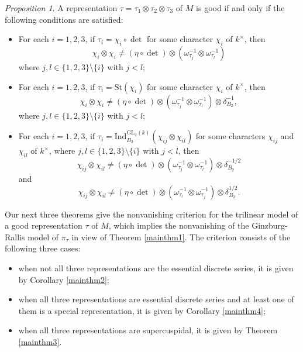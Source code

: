 \documentclass[12pt]{amsart}
\newcommand{\GL}{{\mathrm{GL}}}
\theoremstyle{Theorem}
\theoremstyle{Theorem}
\theoremstyle{Theorem}
\theoremstyle{Theorem}
\theoremstyle{Plain}
\theoremstyle{remark}
\theoremstyle{remark}
\theoremstyle{Definition}
\newtheorem{prpd}[dfn]{Proposition}
\begin{document}
\begin{prpd}
    \label{goodcr}
    A representation $ \tau = \tau_1 \otimes \tau_2 \otimes \tau_3 $ of $M$ is good if and only if the following conditions are satisfied: 
    \begin{itemize}
        \item[(G1)] For each $ i = 1, 2, 3 $, if $ \tau_i = \chi_i \circ \det $ for some character $\chi_i$ of $k^\times$, then
        \[
            \chi_i \otimes \chi_i \ne ( \eta \circ \det ) \otimes \left( \omega_{ \tau_j }^{-1} \otimes \omega_{ \tau_l }^{-1} \right)
        \]
        where $ j, l \in \{ 1, 2, 3 \} \setminus \{ i \} $ with $ j < l $;
        \item[(G2)] For each $ i = 1, 2, 3 $, if $ \tau_i = \mathrm{St} \left( \chi_i \right) $ for some character $\chi_i$ of $k^\times$, then
        \[
            \chi_i \otimes \chi_i \ne ( \eta \circ \det ) \otimes \left( \omega_{ \tau_j }^{-1} \otimes \omega_{ \tau_l }^{-1} \right) \otimes \delta_{B_2}^{-1},
        \]
        where $ j, l \in \{ 1, 2, 3 \} \setminus \{ i \} $ with $ j < l $;
        \item[(G3)] For each $ i = 1, 2, 3 $, if $ \tau_i = \mathrm{Ind}_{B_2}^{ \GL_2(k) } ( \chi_{ij} \otimes \chi_{il} ) $ for some characters $ \chi_{ij} $ and $ \chi_{il} $ of $k^\times$, where $ j, l \in \{ 1, 2, 3 \} \setminus \{ i \} $ with $ j < l $, then
        \[
            \chi_{ij} \otimes \chi_{il} \ne  ( \eta \circ \det ) \otimes \left( \omega_{ \tau_j }^{-1} \otimes \omega_{ \tau_l }^{-1} \right) \otimes \delta_{B_2}^{-1/2}
        \]
        and
        \[
            \chi_{ij} \otimes \chi_{il} \ne ( \eta \circ \det ) \otimes \left( \omega_{ \tau_l }^{-1} \otimes \omega_{ \tau_j }^{-1} \right) \otimes \delta_{B_2}^{1/2}.
        \]
    \end{itemize}
\end{prpd}

Our next three theorems give the nonvanishing criterion for the trilinear model of a good representation $\tau$ of $M$, which implies the nonvanishing of the Ginzburg-Rallis model 
of $ \pi_\tau $ in view of Theorem \ref{mainthm1}. The criterion consists of the following three cases:
\begin{itemize}
    \item when not all three representations are the essential discrete series, it is given by Corollary \ref{mainthm2};
    \item when all three representations are essential discrete series and at least one of them is a special representation,  it is given by Corollary \ref{mainthm4};
    \item when all three representations are supercuspidal,  it is given by Theorem \ref{mainthm3}.
\end{itemize}
\end{document}
